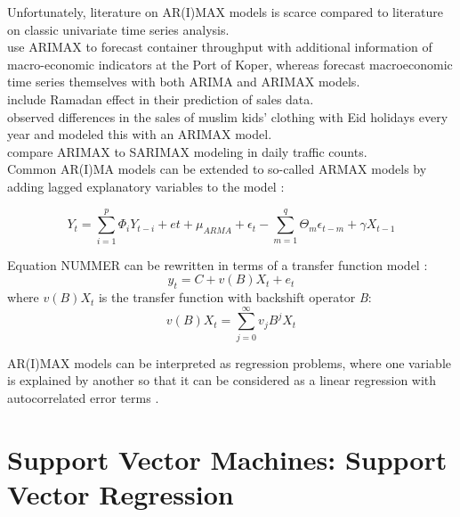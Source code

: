 \documentclass[a4paper, 11pt]{article}
\begin{document}
Unfortunately, literature on AR(I)MAX models is scarce compared to literature on classic univariate time series analysis.\\
\cite{Intihar.2017} use ARIMAX to forecast container throughput with additional information of macro-economic indicators at the Port of Koper, whereas \cite{Durka.2012} forecast macroeconomic time series themselves with both ARIMA and ARIMAX models.\\
\cite{Lee.2010} include Ramadan effect in their prediction of sales data. \\
\cite{Anggraeni.2015} observed differences in the sales of muslim kids' clothing with Eid holidays every year and modeled this with an ARIMAX model. \\
\cite{Cools.2009} compare ARIMAX to SARIMAX modeling in daily traffic counts. \\

Common AR(I)MA models can be extended to so-called ARMAX models by adding lagged explanatory variables to the model \citep{Andreoni.2006b}:

\begin{equation}
Y_{t} = \sum_{i = 1}^{p}\Phi_{i}Y_{t-i} + e{t} + \mu_{ARMA} + \epsilon_{t} - \sum_{m = 1}^{q} \Theta_{m}\epsilon_{t-m} + \gamma X_{t-1} 
\end{equation}

Equation NUMMER can be rewritten in terms of a transfer function model \citep{Durka.2012}:
\begin{equation}
y_{t} = C + v(B)X_{t} + e_{t}
\end{equation}
where $v(B)X_{t}$ is the transfer function with backshift operator \textit{B}:
\begin{equation}
	v(B)X_{t} = \sum_{j = 0}^{\infty} v_{j}B^{j}X_{t}
\end{equation}

AR(I)MAX models can be interpreted as regression problems, where one variable is explained by another so that it can be considered as a linear regression with autocorrelated error terms \citep{Cools.2009}.

\section{Support Vector Machines: Support Vector Regression}
\end{document}
